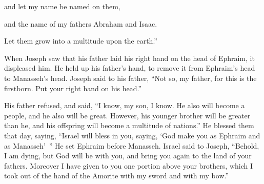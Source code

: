 {\par }{\Q and let my name be named on them,
\par }{\Q and the name of my fathers Abraham and Isaac.
\par }{\Q Let them grow into a multitude upon the earth.”
\par }{\PP {}When Joseph saw that his father laid his right hand on the head of Ephraim, it displeased him. He held up his father’s hand, to remove it from Ephraim’s head to Manasseh’s head.
Joseph said to his father, “Not so, my father, for this is the firstborn. Put your right hand on his head.”
\par }{\PP {}His father refused, and said, “I know, my son, I know. He also will become a people, and he also will be great. However, his younger brother will be greater than he, and his offspring will become a multitude of nations.”
He blessed them that day, saying, “Israel will bless in you, saying, ‘God make you as Ephraim and as Manasseh’ ” He set Ephraim before Manasseh.
Israel said to Joseph, “Behold, I am dying, but God will be with you, and bring you again to the land of your fathers.
Moreover I have given to you one portion above your brothers, which I took out of the hand of the Amorite with my sword and with my bow.”

}
